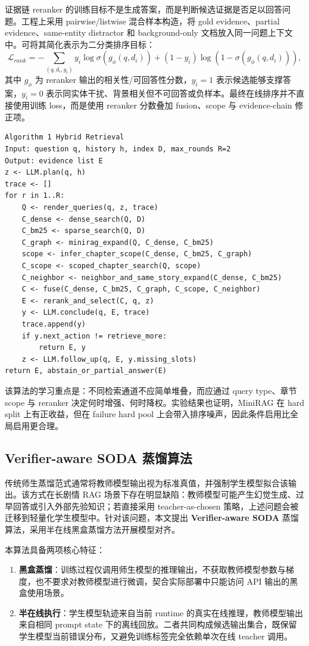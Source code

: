 \documentclass[UTF8,a4paper,12pt]{ctexart}
\begin{document}
证据链 reranker 的训练目标不是生成答案，而是判断候选证据是否足以回答问题。工程上采用 pairwise/listwise 混合样本构造，将 gold evidence、partial evidence、same-entity distractor 和 background-only 文档放入同一问题上下文中。可将其简化表示为二分类排序目标：
\[
\mathcal{L}_{rank}=-\sum_{(q,d_i,y_i)}y_i\log \sigma(g_{\phi}(q,d_i))+(1-y_i)\log(1-\sigma(g_{\phi}(q,d_i))),
\]
其中 $g_{\phi}$ 为 reranker 输出的相关性/可回答性分数，$y_i=1$ 表示候选能够支撑答案，$y_i=0$ 表示同实体干扰、背景相关但不可回答或负样本。最终在线排序并不直接使用训练 loss，而是使用 reranker 分数叠加 fusion、scope 与 evidence-chain 修正项。

\begin{verbatim}
Algorithm 1 Hybrid Retrieval
Input: question q, history h, index D, max_rounds R=2
Output: evidence list E
z <- LLM.plan(q, h)
trace <- []
for r in 1..R:
    Q <- render_queries(q, z, trace)
    C_dense <- dense_search(Q, D)
    C_bm25 <- sparse_search(Q, D)
    C_graph <- minirag_expand(Q, C_dense, C_bm25)
    scope <- infer_chapter_scope(C_dense, C_bm25, C_graph)
    C_scope <- scoped_chapter_search(Q, scope)
    C_neighbor <- neighbor_and_same_story_expand(C_dense, C_bm25)
    C <- fuse(C_dense, C_bm25, C_graph, C_scope, C_neighbor)
    E <- rerank_and_select(C, q, z)
    y <- LLM.conclude(q, E, trace)
    trace.append(y)
    if y.next_action != retrieve_more:
        return E, y
    z <- LLM.follow_up(q, E, y.missing_slots)
return E, abstain_or_partial_answer(E)
\end{verbatim}

该算法的学习重点是：不同检索通道不应简单堆叠，而应通过 query type、章节 scope 与 reranker 决定何时增强、何时降权。实验结果也证明，MiniRAG 在 hard split 上有正收益，但在 failure hard pool 上会带入排序噪声，因此条件启用比全局启用更合理。

\subsection{Verifier-aware SODA 蒸馏算法}

传统师生蒸馏范式通常将教师模型输出视为标准真值，并强制学生模型拟合该输出。该方式在长剧情 RAG 场景下存在明显缺陷：教师模型可能产生幻觉生成、过早回答或引入外部先验知识；若直接采用 teacher-as-chosen 策略，上述问题会被迁移到轻量化学生模型中。针对该问题，本文提出 \textbf{Verifier-aware SODA} 蒸馏算法，采用半在线黑盒蒸馏方法开展模型对齐。

本算法具备两项核心特征：
\begin{enumerate}
  \item \textbf{黑盒蒸馏}：训练过程仅调用师生模型的推理输出，不获取教师模型参数与梯度，也不要求对教师模型进行微调，契合实际部署中只能访问 API 输出的黑盒使用场景。
  \item \textbf{半在线执行}：学生模型轨迹来自当前 runtime 的真实在线推理，教师模型输出来自相同 prompt state 下的离线回放。二者共同构成候选输出集合，既保留学生模型当前错误分布，又避免训练标签完全依赖单次在线 teacher 调用。
\end{enumerate}
\end{document}
